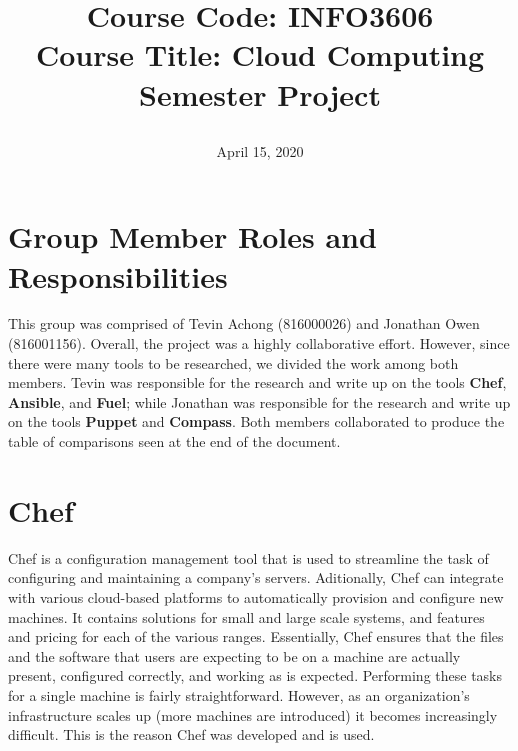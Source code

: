 \documentclass[a4paper, 12pt]{article}
\begin{document}
\title{
		\textbf{Course Code:} INFO3606\\
		\textbf{Course Title:} Cloud Computing\\
		\textbf{Semester Project}
		\date{April 15, 2020}
}
\maketitle

\newpage
{}

\tableofcontents

\newpage
\section{Group Member Roles and Responsibilities}
This group was comprised of Tevin Achong (816000026) and Jonathan Owen (816001156). Overall, the project was a highly collaborative effort. However, since there were many tools to be researched, we divided the work among both members. Tevin was responsible for the research and write up on the tools \textbf{Chef}, \textbf{Ansible}, and \textbf{Fuel}; while Jonathan was responsible for the research and write up on the tools \textbf{Puppet} and \textbf{Compass}. Both members collaborated to produce the table of comparisons seen at the end of the document.

\newpage
\section{Chef}
Chef is a configuration management tool that is used to streamline the task of configuring and maintaining a company's servers. Aditionally, Chef can integrate with various cloud-based platforms to automatically provision and configure new machines. It contains solutions for small and large scale systems, and features and pricing for each of the various ranges. Essentially, Chef ensures that the files and the software that users are expecting to be on a machine are actually present, configured correctly, and working as is expected. Performing these tasks for a single machine is fairly straightforward. However, as an organization's infrastructure scales up (more machines are introduced) it becomes increasingly difficult. This is the reason Chef was developed and is used.
\end{document}
